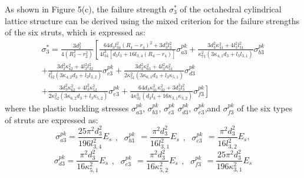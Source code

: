 \documentclass{article} %
\begin{document}
As shown in Figure 5(c), the failure strength $\sigma _{3}^{*} $ of the octahedral cylindrical lattice structure can be derived using the mixed criterion for the failure strengths of the six struts, which is expressed as:
\begin{equation} \label{GrindEQ__28_} 
\begin{array}{l} {\sigma _{3}^{*} =\frac{3d_{2}^{2} }{4\left(R_{2}^{2} -r_{2}^{2} \right)} \left[\frac{64d_{3} l_{34}^{2} \left(R_{4} -r_{4} \right)^{2} +3d_{3}^{3} l_{3}^{2} }{4l_{34}^{3} \left[d_{3} l_{3} +16l_{3,4} \left(R_{4} -r_{4} \right)\right]} \sigma _{a3}^{pk} \right. +\frac{3d_{3}^{2} \kappa _{41}^{2} +4l_{3}^{2} l_{31}^{2} }{\kappa _{71}^{2} \left(3\kappa _{4,1} d_{3} +l_{3} l_{3,1} \right)} \sigma _{b3}^{pk} } \\ {+\frac{3d_{3}^{2} \kappa _{42}^{2} +4l_{3}^{2} l_{32}^{2} }{l_{32}^{2} \left(3\kappa _{4,2} d_{3} +l_{3} l_{3,2} \right)} \sigma _{c3}^{pk} +\frac{3d_{3}^{2} \kappa _{61}^{2} +4l_{3}^{2} \kappa _{51}^{2} }{2\kappa _{51}^{2} \left(3\kappa _{6,1} d_{3} +l_{3} \kappa _{5,1} \right)} \sigma _{d3}^{pk} } \\ {+\frac{3d_{3}^{2} \kappa _{62}^{2} +4l_{3}^{2} \kappa _{52}^{2} }{2\kappa _{52}^{2} \left(3\kappa _{6,2} d_{3} +l_{3} \kappa _{5,2} \right)} \sigma _{e3}^{pk} +\frac{64d_{3} \kappa _{31}^{2} \kappa _{32}^{2} +3d_{3}^{3} l_{3}^{2} }{4\kappa _{31}^{3} \left(d_{3} l_{3} +16\kappa _{3,1} \kappa _{3,2} \right)} \left. \sigma _{f3}^{pk} \right]} \end{array} 
\end{equation} 
where the plastic buckling stresses $\sigma _{a3}^{pk} $, $\sigma _{b3}^{pk} $, $\sigma _{c3}^{pk} $ $\sigma _{d3}^{pk} $, $\sigma _{e3}^{pk} $,and $\sigma _{f3}^{pk} $ of the six types of struts are expressed as:
\[\sigma _{a3}^{pk} =\frac{25\pi ^{2} d_{3}^{2} }{196l_{3,4}^{2} } E_{s} \begin{array}{cc} {,} & {\sigma _{b3}^{pk} } \end{array}=\frac{\pi ^{2} d_{3}^{2} }{16l_{3,1}^{2} } E_{s} \begin{array}{cc} {,} & {\sigma _{c3}^{pk} } \end{array}=\frac{\pi ^{2} d_{3}^{2} }{16l_{3,2}^{2} } E_{s} ,\] 
\[\sigma _{d3}^{pk} =\frac{\pi ^{2} d_{3}^{2} }{16\kappa _{5,1}^{2} } E_{s} \begin{array}{cc} {,} & {\sigma _{e3}^{pk} } \end{array}=\frac{\pi ^{2} d_{3}^{2} }{16\kappa _{5,2}^{2} } E_{s} \begin{array}{cc} {,} & {\sigma _{f3}^{pk} } \end{array}=\frac{25\pi ^{2} d_{3}^{2} }{196\kappa _{3,1}^{2} } E_{s} \] 
\end{document}
